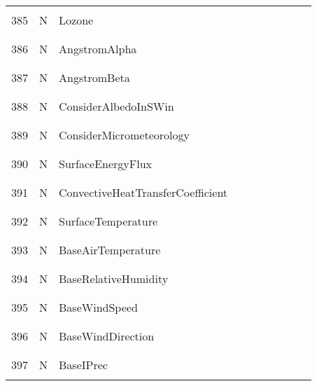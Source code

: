 \begin{longtable}{|c|c|l|c|c|c|c|p{}|c|p{}|}
&&&&&&&&&\\\hline%
&&&&&&&&&\\
385 & N & Lozone & & & & & & & \\
&&&&&&&&&\\\hline%
&&&&&&&&&\\
386 & N & AngstromAlpha & & & & & & & \\
&&&&&&&&&\\\hline%
&&&&&&&&&\\
387 & N & AngstromBeta & & & & & & & \\
&&&&&&&&&\\\hline%
&&&&&&&&&\\
388 & N & ConsiderAlbedoInSWin & & & & & & & \\
&&&&&&&&&\\\hline%
&&&&&&&&&\\
389 & N & ConsiderMicrometeorology & & & & & & & \\
&&&&&&&&&\\\hline%
&&&&&&&&&\\
390 & N & SurfaceEnergyFlux & & & & & & & \\
&&&&&&&&&\\\hline%
&&&&&&&&&\\
391 & N & ConvectiveHeatTransferCoefficient & & & & & & & \\
&&&&&&&&&\\\hline%
&&&&&&&&&\\
392 & N & SurfaceTemperature & & & & & & & \\
&&&&&&&&&\\\hline%
&&&&&&&&&\\
393 & N & BaseAirTemperature & & & & & & & \\
&&&&&&&&&\\\hline%
&&&&&&&&&\\
394 & N & BaseRelativeHumidity & & & & & & & \\
&&&&&&&&&\\\hline%
&&&&&&&&&\\
395 & N & BaseWindSpeed & & & & & & & \\
&&&&&&&&&\\\hline%
&&&&&&&&&\\
396 & N & BaseWindDirection & & & & & & & \\
&&&&&&&&&\\\hline%
&&&&&&&&&\\
397 & N & BaseIPrec & & & & & & & \\
&&&&&&&&&\\\hline%

\end{longtable}
